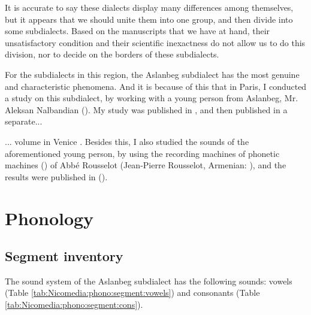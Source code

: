 It is accurate to say these dialects display many differences among themselves, but it appears that we should unite them into one group, and then divide into some subdialects. Based on the manuscripts that we have at hand, their unsatisfactory condition and their scientific inexactness do not allow us to do this division, nor to decide on the borders of these subdialects. 

For the subdialects in this region, the Aslanbeg subdialect has the most genuine and characteristic phenomena. And it is because of this that in Paris, I conducted a study on this subdialect, by working with a young person from Aslanbeg, Mr. Aleksan Nalbandian (). My study was published in , and then published in a separate... 


 
\begin{adjarianpage}\label{page:242}\end{adjarianpage}%


... volume in Venice  \citep{Adjarian-Aslanbeg}. Besides this, I also studied the sounds of the aforementioned young person, by using the recording machines of phonetic machines () of Abbé Rousselot (Jean-Pierre Rousselot, Armenian: ), and the results were published in \citet{Adjarian-1899-ArmenianExplosives} (). 


\section{Phonology}
\subsection{Segment inventory}\label{section:nicomedia:phono:inventory}

The sound system of the Aslanbeg subdialect has the following sounds: vowels (Table \ref{tab:Nicomedia:phono:segment:vowels}) and consonants (Table \ref{tab:Nicomedia:phono:segment:cons}). 



